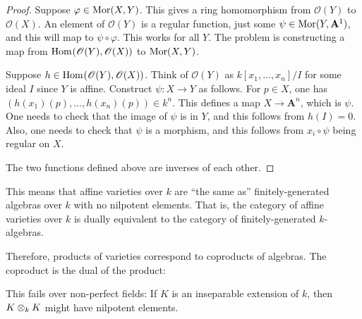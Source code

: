 \documentclass [11 pt, oneside, margin = 1 in] {article}
\begin{document}
\begin{proof}
Suppose $\varphi \in \operatorname{Mor}(X,Y)$. This gives a ring homomorphism from $\mathscr{O}(Y) $ to $\mathscr{O}(X)$. An element of $\mathscr{O}(Y)$ is a regular function, just some $\psi\in \operatorname{Mor}(Y, \mathbf{A}^1)$, and this will map to $\psi\circ\varphi$. This works for all $Y$. The problem is constructing a map from $\operatorname{Hom}_{}(\mathscr{O}(Y), \mathscr{O}(X))$ to $\operatorname{Mor}(X,Y)$. 

Suppose $h\in \operatorname{Hom}_{}(\mathscr{O}(Y),\mathscr{O}(X) )$. Think of $\mathscr{O}(Y)$ as $k[x_1,\hdots, x_n]/I$ for some ideal $I$ since $Y$ is affine. Construct $\psi:X\longrightarrow Y$ as follows. For $p\in X$, one has $(h(x_1)(p),\hdots, h(x_n) (p))\in k^n$. This defines a map $X\longrightarrow \mathbf{A}^n$, which is $\psi$. One needs to check that the image of $\psi$ is in $Y$, and this follows from $h(I)=0$. Also, one needs to check that $\psi$ is a morphism, and this follows from $x_i\circ\psi$ being regular on $X$.

The two functions defined above are inverses of each other.
\end{proof}
\begin{remark}
This means that affine varieties over $k$ are ``the same as'' finitely-generated algebras over $k$ with no nilpotent elements. That is, the category of affine varieties over $k$ is dually equivalent to the category of finitely-generated $k$-algebras.

Therefore, products of varieties correspond to coproducts of algebras. The coproduct is the dual of the product:
\begin{center}
\end{center}
\end{remark}
\begin{warn}
	This fails over non-perfect fields: If $K$ is an inseparable extension of $k$, then $K\otimes_k K$ might have nilpotent elements. 
\end{warn}
\end{document}
